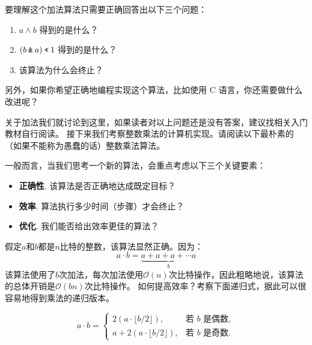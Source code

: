 \begin{thinking} 要理解这个加法算法只需要正确回答出以下三个问题：

\begin{enumerate}
\item $a \wedge b$ 得到的是什么？

\item $(b \mathbin{\text{\ttfamily \&}} a) \mathbin{\text{\ttfamily <<}} 1$ 得到的是什么？

\item 该算法为什么会终止？

\end{enumerate}
另外，如果你希望正确地编程实现这个算法，比如使用 C 语言，你还需要做什么改进呢？
\end{thinking}

关于加法我们就讨论到这里，如果读者对以上问题还是没有答案，建议找相关入门教材自行阅读。
接下来我们考察整数乘法的计算机实现。请阅读以下最朴素的（如果不能称为愚蠢的话）整数乘法算法。

\begin{center}
	
\end{center}

一般而言，当我们思考一个新的算法，会重点考虑以下三个关键要素：
\begin{itemize}
	\item \textbf{正确性}. 该算法是否正确地达成既定目标？

	\item \textbf{效率}.  算法执行多少时间（步骤）才会终止？

	\item \textbf{优化}. 我们能否给出效率更佳的算法？
\end{itemize}

假定$a$和$b$都是$n$比特的整数，该算法显然正确。因为：
\[a \cdot b = \underbrace{a + a + a + \cdots a}_{b} \]
该算法使用了$b$次加法，每次加法使用$\mathcal{O}(n)$次比特操作，因此粗略地说，该算法的总体开销是$\mathcal{O}(bn)$次比特操作。
如何提高效率？考察下面递归式，据此可以很容易地得到乘法的递归版本。

\begin{equation}
a \cdot b =
\begin{cases}
2(a\cdot \lfloor b/2 \rfloor), & \text{若 } b \text{ 是偶数},\\
a + 2(a\cdot \lfloor b/2 \rfloor), & \text{若 } b \text{ 是奇数}.
\end{cases}
\end{equation}

